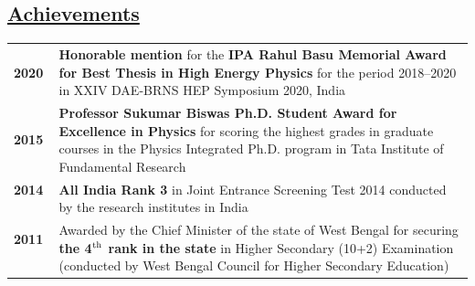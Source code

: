 \documentclass[a4paper,11pt]{article}
\begin{document}
\subsection*{\underline{Achievements}}

\begin{tabular}{ p{2cm} p{13cm} }
\textbf{2020} & {\textbf{Honorable mention} for the \textbf{IPA Rahul Basu Memorial Award for Best Thesis in High Energy Physics} for the period 2018--2020 in XXIV DAE-BRNS HEP Symposium 2020, India} \\
\textbf{2015} & {\textbf{Professor Sukumar Biswas Ph.D. Student Award for Excellence in Physics} for scoring the highest grades in graduate courses in the Physics Integrated Ph.D. program in Tata Institute of Fundamental Research} \\
\textbf{2014} \ & \textbf{All India Rank 3} in Joint Entrance Screening Test 2014 conducted by the research institutes in India  \\
\textbf{2011} \ & Awarded by the Chief Minister of the state of West Bengal for securing \textbf{the 4$^{\rm{th}}$ rank in the state} in Higher Secondary (10+2) Examination (conducted by West Bengal Council for Higher Secondary Education)  \\
\end{tabular}
\end{document}
